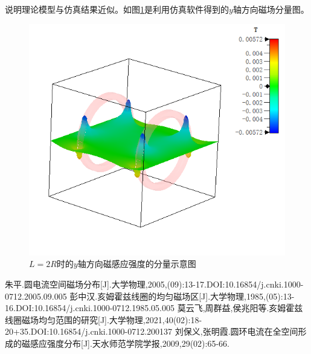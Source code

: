 \documentclass{ctexart}
\begin{document}
\begin{multicols}{2}
说明理论模型与仿真结果近似。如图\ref{$L=2R$时的$y$轴方向磁感应强度的分量示意图}是利用仿真软件得到的$y$轴方向磁场分量图。
\begin{figure}[H]
    \centering
    \includegraphics[scale=0.5]{./pic/L=2R仿真.png}
    \caption{$L=2R$时的$y$轴方向磁感应强度的分量示意图}
    \label{$L=2R$时的$y$轴方向磁感应强度的分量示意图}
\end{figure}
\begin{thebibliography}{4}
    朱平.圆电流空间磁场分布[J].大学物理,2005,(09):13-17.DOI:10.16854/j.cnki.1000-0712.2005.09.005
    彭中汉.亥姆霍兹线圈的均匀磁场区[J].大学物理,1985,(05):13-16.DOI:10.16854/j.cnki.1000-0712.1985.05.005        
    莫云飞,周群益,侯兆阳等.亥姆霍兹线圈磁场均匀范围的研究[J].大学物理,2021,40(02):18-20+35.DOI:10.16854/j.cnki.1000-0712.200137
    刘保义,张明霞.圆环电流在全空间形成的磁感应强度分布[J].天水师范学院学报,2009,29(02):65-66.
\end{thebibliography}
\end{multicols}
\end{document}
